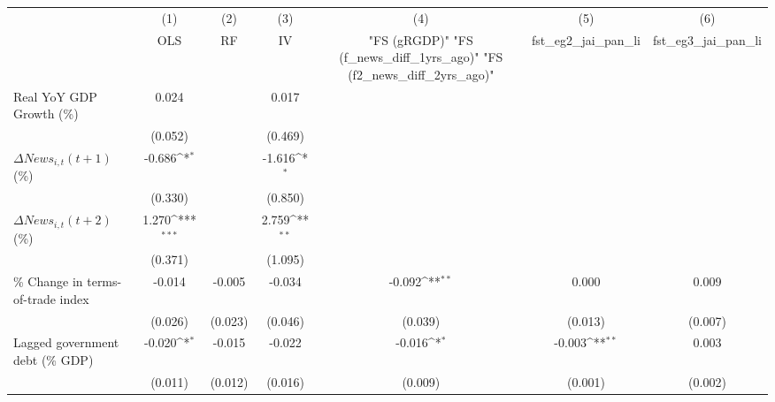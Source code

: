 {
\def\sym#1{\ifmmode^{#1}\else\(^{#1}\)\fi}
\begin{tabular}{l*{6}{c}}
\toprule
                    &\multicolumn{1}{c}{(1)}&\multicolumn{1}{c}{(2)}&\multicolumn{1}{c}{(3)}&\multicolumn{1}{c}{(4)}&\multicolumn{1}{c}{(5)}&\multicolumn{1}{c}{(6)}\\
                    &\multicolumn{1}{c}{OLS}&\multicolumn{1}{c}{RF}&\multicolumn{1}{c}{IV}&\multicolumn{1}{c}{ "FS (gRGDP)"  "FS (f_news_diff_1yrs_ago)"  "FS (f2_news_diff_2yrs_ago)" }&\multicolumn{1}{c}{fst_eg2_jai_pan_li}&\multicolumn{1}{c}{fst_eg3_jai_pan_li}\\
\midrule
Real YoY GDP Growth (\%)&       0.024         &                     &       0.017         &                     &                     &                     \\
                    &     (0.052)         &                     &     (0.469)         &                     &                     &                     \\
\addlinespace
$ \Delta News_{i,t}(t+1)$ (\%)&      -0.686\sym{*}  &                     &      -1.616\sym{*}  &                     &                     &                     \\
                    &     (0.330)         &                     &     (0.850)         &                     &                     &                     \\
\addlinespace
$ \Delta News_{i,t}(t+2)$ (\%)&       1.270\sym{***}&                     &       2.759\sym{**} &                     &                     &                     \\
                    &     (0.371)         &                     &     (1.095)         &                     &                     &                     \\
\addlinespace
\% Change in terms-of-trade index&      -0.014         &      -0.005         &      -0.034         &      -0.092\sym{**} &       0.000         &       0.009         \\
                    &     (0.026)         &     (0.023)         &     (0.046)         &     (0.039)         &     (0.013)         &     (0.007)         \\
\addlinespace
Lagged government debt (\% GDP)&      -0.020\sym{*}  &      -0.015         &      -0.022         &      -0.016\sym{*}  &      -0.003\sym{**} &       0.003         \\
                    &     (0.011)         &     (0.012)         &     (0.016)         &     (0.009)         &     (0.001)         &     (0.002)         \\

\end{tabular}}

